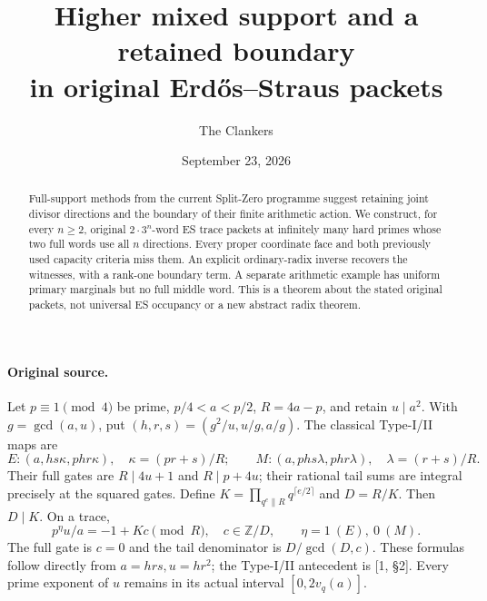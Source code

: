 \documentclass[10pt]{article}
\title{Higher mixed support and a retained boundary\\in original Erd\H{o}s--Straus packets}
\author{The Clankers}
\date{September 23, 2026}
\begin{document}
\maketitle
\begin{abstract}
Full-support methods from the current Split-Zero programme suggest retaining
joint divisor directions and the boundary of their finite arithmetic action.
We construct, for every $n\ge2$, original $2\cdot3^n$-word ES trace packets at
infinitely many hard primes whose two full words use all $n$ directions.
Every proper coordinate face and both previously used capacity criteria miss
them. An explicit ordinary-radix inverse recovers the witnesses, with a
rank-one boundary term. A separate arithmetic example has uniform primary
marginals but no full middle word. This is a theorem about the stated
original packets, not universal ES occupancy or a new abstract radix theorem.
\end{abstract}

\paragraph{Original source.}
Let $p\equiv1\pmod4$ be prime, $p/4<a<p/2$, $R=4a-p$, and retain
$u\mid a^2$. With $g=\gcd(a,u)$, put
$(h,r,s)=(g^2/u,u/g,a/g)$. The classical Type-I/II maps are
\[
 E:(a,hs\kappa,phr\kappa),\quad\kappa=(pr+s)/R;
 \qquad M:(a,phs\lambda,phr\lambda),\quad\lambda=(r+s)/R.
\]
Their full gates are $R\mid4u+1$ and $R\mid p+4u$; their rational tail sums
are integral precisely at the squared gates. Define
$K=\prod_{q^e\parallel R}q^{\lceil e/2\rceil}$ and $D=R/K$.
Then $D\mid K$. On a trace,
\[
 p^\eta u/a=-1+Kc\pmod R,\quad c\in\mathbb Z/D,
 \qquad\eta=1\ (E),\ 0\ (M).
\]
The full gate is $c=0$ and the tail denominator is $D/\gcd(D,c)$.
These formulas follow directly from $a=hrs,u=hr^2$; the Type-I/II
antecedent is [1, \S2]. Every prime exponent of $u$ remains in its actual
interval $[0,2v_q(a)]$.
\end{document}
